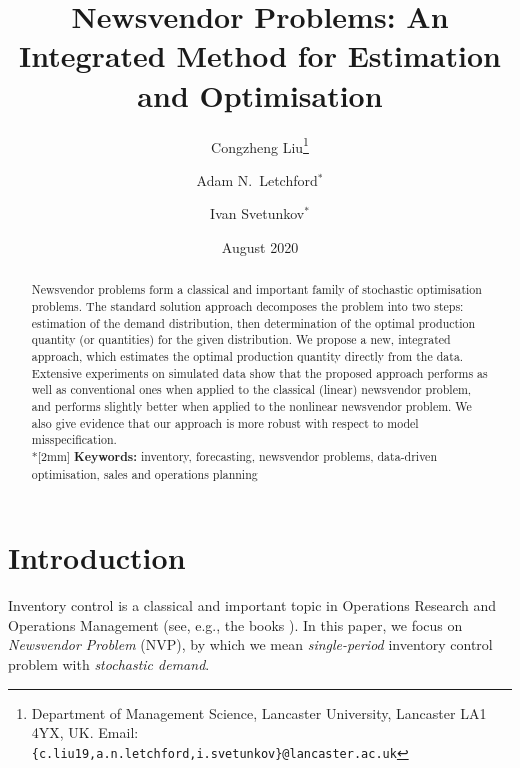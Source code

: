\documentclass[a4paper,11pt]{article}
\title{Newsvendor Problems: An Integrated Method for Estimation and Optimisation}
\author{Congzheng Liu\thanks{Department of Management Science,
Lancaster University, Lancaster LA1 4YX, UK.
Email: {\tt \{c.liu19,a.n.letchford,i.svetunkov\}@lancaster.ac.uk}}
\and Adam N.\ Letchford$^*$ \and Ivan Svetunkov$^*$} %
\date{August 2020}
\begin{document}
\maketitle

\begin{abstract}
Newsvendor problems form a classical and important family of stochastic optimisation problems. The standard solution approach decomposes the problem into two steps: estimation of the demand distribution, then determination of the optimal production quantity (or quantities) for the given distribution. We propose a new, integrated approach, which estimates the optimal production quantity directly from the data. Extensive experiments on simulated data show that the proposed approach performs as well as conventional ones when applied to the classical (linear) newsvendor problem, and performs slightly better when applied to the nonlinear newsvendor problem. We also give evidence that our approach is more robust with respect to model misspecification.
\\*[2mm]
{\bf Keywords:} inventory, forecasting, newsvendor problems, data-driven optimisation, sales and operations planning
\end{abstract}


\section{Introduction}

Inventory control is a classical and important topic in Operations Research and Operations Management (see, e.g., the books \cite{Po02,SPP98,Zi00}). In this paper, we focus on \emph{Newsvendor Problem} (NVP), by which we mean \emph{single-period} inventory control problem with \emph{stochastic demand}.
\end{document}
